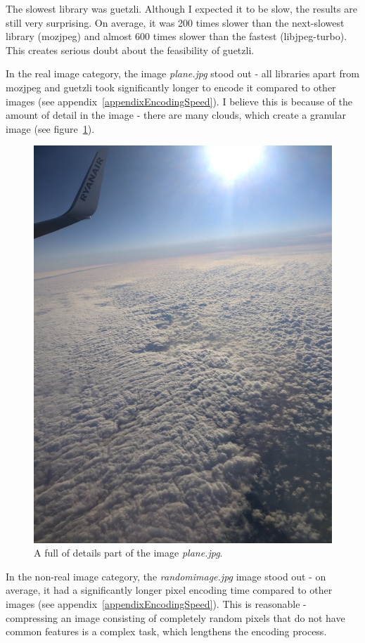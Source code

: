 \documentclass[12pt]{article}
\begin{document}
The slowest library was guetzli. Although I expected it to be slow, the results are still very surprising. On average, it was 200 times slower than the next-slowest library (mozjpeg) and almost 600 times slower than the fastest (libjpeg-turbo). This creates serious doubt about the feasibility of guetzli.

In the real image category, the image \textit{plane.jpg} stood out - all libraries apart from mozjpeg and guetzli took significantly longer to encode it compared to other images (see appendix~\ref{appendixEncodingSpeed}). I believe this is because of the amount of detail in the image - there are many clouds, which create a granular image (see figure~\ref{planeCutout}).
\begin{figure}[H]
	\centering
	\includegraphics[trim={9cm 10cm 9cm 20cm},clip,scale=0.6]{plane.jpg}
	\caption{A full of details part of the image \textit{plane.jpg}.}
	\label{planeCutout}
\end{figure}
In the non-real image category, the \textit{randomimage.jpg} image stood out - on average, it had a significantly longer pixel encoding time compared to other images (see appendix~\ref{appendixEncodingSpeed}). This is reasonable - compressing an image consisting of completely random pixels that do not have common features is a complex task, which lengthens the encoding process.
\end{document}
